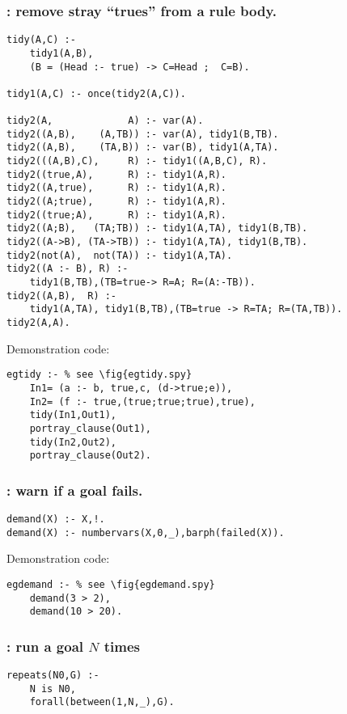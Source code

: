 \subsubsection{ : remove stray ``trues'' from a rule body. 
}
\label{sec:tidy/2}
\begin{Verbatim}
tidy(A,C) :-
    tidy1(A,B),
    (B = (Head :- true) -> C=Head ;  C=B).

tidy1(A,C) :- once(tidy2(A,C)).

tidy2(A,             A) :- var(A). 
tidy2((A,B),    (A,TB)) :- var(A), tidy1(B,TB).
tidy2((A,B),    (TA,B)) :- var(B), tidy1(A,TA).
tidy2(((A,B),C),     R) :- tidy1((A,B,C), R).
tidy2((true,A),      R) :- tidy1(A,R).
tidy2((A,true),      R) :- tidy1(A,R).
tidy2((A;true),      R) :- tidy1(A,R).
tidy2((true;A),      R) :- tidy1(A,R).
tidy2((A;B),   (TA;TB)) :- tidy1(A,TA), tidy1(B,TB).
tidy2((A->B), (TA->TB)) :- tidy1(A,TA), tidy1(B,TB).
tidy2(not(A),  not(TA)) :- tidy1(A,TA).
tidy2((A :- B), R) :-
    tidy1(B,TB),(TB=true-> R=A; R=(A:-TB)).
tidy2((A,B),  R) :-
    tidy1(A,TA), tidy1(B,TB),(TB=true -> R=TA; R=(TA,TB)).
tidy2(A,A).
\end{Verbatim}
Demonstration code:
\begin{Verbatim}
egtidy :- % see \fig{egtidy.spy}
    In1= (a :- b, true,c, (d->true;e)),
    In2= (f :- true,(true;true;true),true),
    tidy(In1,Out1),
    portray_clause(Out1),
    tidy(In2,Out2),
    portray_clause(Out2).
\end{Verbatim}
\subsubsection{ : warn if a goal fails. 
}
\label{sec:demand/1}
\begin{Verbatim}
demand(X) :- X,!.
demand(X) :- numbervars(X,0,_),barph(failed(X)).
\end{Verbatim}
Demonstration code:
\begin{Verbatim}
egdemand :- % see \fig{egdemand.spy}
    demand(3 > 2),
    demand(10 > 20).
\end{Verbatim}
\subsubsection{ : run a goal $N$ times
}
\begin{Verbatim}
repeats(N0,G) :-
    N is N0,
    forall(between(1,N,_),G).
\end{Verbatim} 
